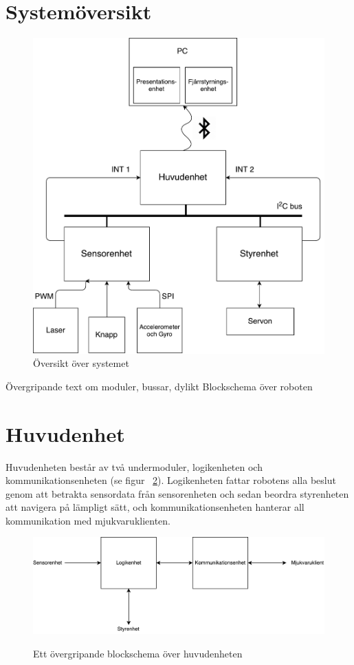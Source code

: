\documentclass{article}
\begin{document}
\section{Systemöversikt}
\begin{figure}[H]
\centering
\includegraphics[scale=0.35]{oversikt_systemet}
\caption{Översikt över systemet}
\label{fig:oversikt_systemet}
\end{figure}
Övergripande text om moduler, bussar, dylikt
Blockschema över roboten

\section{Huvudenhet}

Huvudenheten består av två undermoduler, logikenheten och kommunikationsenheten (se figur ~\ref{fig:huvudenhet}). Logikenheten fattar robotens alla beslut genom att betrakta sensordata från sensorenheten och sedan beordra styrenheten att navigera på lämpligt sätt, och kommunikationsenheten hanterar all kommunikation med mjukvaruklienten. 

\begin{figure}[H]
  \centering
  \includegraphics[scale=0.5]{Huvudenhet} \\
  \caption{Ett övergripande blockschema över huvudenheten}
  \label{fig:huvudenhet}
\end{figure}
\end{document}
